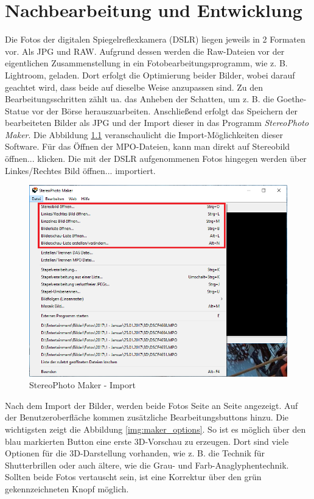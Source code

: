 \documentclass[liststotoc,bibtotoc,fontsize=14pt,]{scrreprt}
\begin{document}
	\chapter{Nachbearbeitung und Entwicklung}
		Die Fotos der digitalen Spiegelreflexkamera (DSLR) liegen jeweils in 2 Formaten vor. Als JPG und RAW. Aufgrund dessen werden die Raw-Dateien vor der eigentlichen Zusammenstellung in ein Fotobearbeitungsprogramm, wie z. B. Lightroom, geladen. Dort erfolgt die Optimierung beider Bilder, wobei darauf geachtet wird, dass beide auf dieselbe Weise anzupassen sind. Zu den Bearbeitungsschritten zählt ua. das Anheben der Schatten, um z. B. die Goethe-Statue vor der Börse herauszuarbeiten. Anschließend erfolgt das Speichern der bearbeiteten Bilder als JPG und der Import dieser in das Programm \textit{StereoPhoto Maker}.
		\newpage
		Die Abbildung \ref{img:maker_import} veranschaulicht die Import-Möglichkeiten dieser Software. Für das Öffnen der MPO-Dateien, kann man direkt auf \grqq{}Stereobild öffnen...\grqq{} klicken. Die mit der DSLR aufgenommenen Fotos hingegen werden über \grqq{}Linkes/Rechtes Bild öffnen...\grqq{} importiert.
		\begin{figure}[H]
			\includegraphics[width=\linewidth]{img/steps/step1.png}
			\caption{StereoPhoto Maker - Import}
			\label{img:maker_import}
		\end{figure}
	
		Nach dem Import der Bilder, werden beide Fotos Seite an Seite angezeigt. Auf der Benutzeroberfläche kommen zusätzliche Bearbeitungsbuttons hinzu. Die wichtigsten zeigt die Abbildung \ref{img:maker_options}. So ist es möglich über den blau markierten Button eine erste 3D-Vorschau zu erzeugen. Dort sind viele Optionen für die 3D-Darstellung vorhanden, wie z. B. die Technik für Shutterbrillen oder auch ältere, wie die Grau- und Farb-Anaglyphentechnik. Sollten beide Fotos vertauscht sein, ist eine Korrektur über den grün gekennzeichneten Knopf möglich.
				
\end{document}

